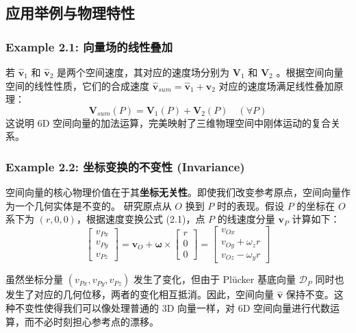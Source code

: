 \subsection{应用举例与物理特性}

\subsubsection{Example 2.1: 向量场的线性叠加}
若 $\hat{\bm{v}}_1$ 和 $\hat{\bm{v}}_2$ 是两个空间速度，其对应的速度场分别为 $\bm{V}_1$ 和 $\bm{V}_2$ 。根据空间向量空间的线性性质，它们的合成速度 $\hat{\bm{v}}_{sum} = \hat{\bm{v}}_1 + \hat{\bm{v}}_2$ 对应的速度场满足线性叠加原理：
\begin{equation}
\bm{V}_{sum}(P) = \bm{V}_1(P) + \bm{V}_2(P) \quad (\forall P) \tag{2.5}
\end{equation}
这说明 $6\text{D}$ 空间向量的加法运算，完美映射了三维物理空间中刚体运动的复合关系。

\subsubsection{Example 2.2: 坐标变换的不变性 (Invariance)}
空间向量的核心物理价值在于其\textbf{坐标无关性}。即使我们改变参考原点，空间向量作为一个几何实体是不变的。
研究原点从 $O$ 换到 $P$ 时的表现。假设 $P$ 的坐标在 $O$ 系下为 $(r, 0, 0)$，根据速度变换公式 (2.1)，点 $P$ 的线速度分量 $\bm{v}_P$ 计算如下：
\begin{equation}
\begin{bmatrix} v_{Px} \\ v_{Py} \\ v_{Pz} \end{bmatrix} = \bm{v}_O + \bm{\omega} \times \begin{bmatrix} r \\ 0 \\ 0 \end{bmatrix} = \begin{bmatrix} v_{Ox} \\ v_{Oy} + \omega_z r \\ v_{Oz} - \omega_y r \end{bmatrix}
\end{equation}

虽然坐标分量 $(v_{Px}, v_{Py}, v_{Pz})$ 发生了变化，但由于 Plücker 基底向量 $\mathcal{D}_P$ 同时也发生了对应的几何位移，两者的变化相互抵消。因此，空间向量 $\hat{\bm{v}}$ 保持不变。这种不变性使得我们可以像处理普通的 3D 向量一样，对 6D 空间向量进行代数运算，而不必时刻担心参考点的漂移。

